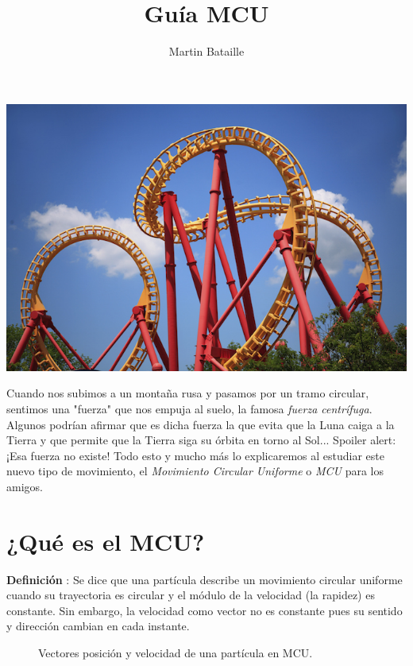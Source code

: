 \documentclass[letterpaper]{article}
\author{Martin Bataille}
\date{}
\title{\bf Guía MCU}
\newcommand{\tpb}[1]{node[midway, below, sloped] {#1}}
\newcommand{\tpa}[1]{node[midway, above, sloped] {#1}}
\newcommand{\tvec}[3]{[->, thick] #1 -- #2 \tpb{#3}}
\newcommand{\tveca}[3]{[->, thick] #1 -- #2 \tpa{#3}}
\newcounter{definiciones}
\newcommand{\defii}{\stepcounter{definiciones} \textbf{Definición \thedefiniciones}: }
\newenvironment{defi}{\begin{framed} \defii}{\end{framed}}
\begin{document}
\maketitle
\thispagestyle{fancy}
\begin{center}
\includegraphics[scale=0.6]{portada.jpg}
\end{center}
\pagebreak

Cuando nos subimos a un montaña rusa y pasamos por un tramo circular, sentimos una "fuerza" que nos empuja al suelo, la famosa \emph{fuerza centrífuga}. Algunos podrían afirmar que es dicha fuerza la que evita que la Luna caiga a la Tierra y que permite que la Tierra siga su órbita en torno al Sol... Spoiler alert: ¡Esa fuerza no existe! Todo esto y mucho más lo explicaremos al estudiar este nuevo tipo de movimiento, el \emph{Movimiento Circular Uniforme} o \emph{MCU} para los amigos. 

\section*{¿Qué es el MCU?}

\begin{defi} 
Se dice que una partícula describe un movimiento circular uniforme cuando su trayectoria es circular y el módulo de la velocidad (la rapidez) es constante. Sin embargo, la velocidad como vector no es constante pues su sentido y dirección cambian en cada instante.
\end{defi}

\begin{figure}[h]
    \centering
    \caption{Vectores posición y velocidad de una partícula en MCU.}
\end{figure}
\end{document}
